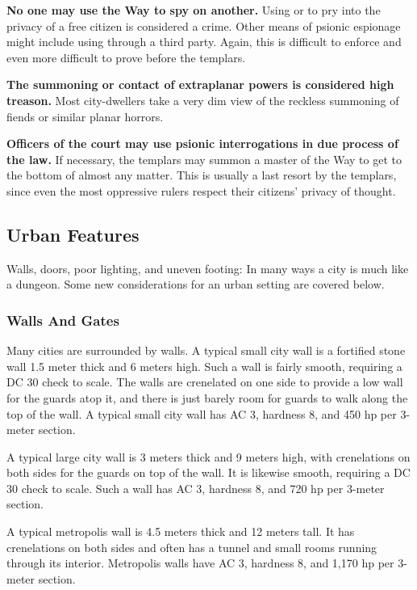 \begin{itemize*}
\item \textbf{No one may use the Way to spy on another.} Using  or  to pry into the privacy of a free citizen is considered a crime. Other means of psionic espionage might include using  through a third party. Again, this is difficult to enforce and even more difficult to prove before the templars.

\item \textbf{The summoning or contact of extraplanar powers is considered high treason.} Most city-dwellers take a very dim view of the reckless summoning of fiends or similar planar horrors.

\item \textbf{Officers of the court may use psionic interrogations in due process of the law.} If necessary, the templars may summon a master of the Way to get to the bottom of almost any matter. This is usually a last resort by the templars, since even the most oppressive rulers respect their citizens' privacy of thought. 
\end{itemize*}

\subsection{Urban Features}
Walls, doors, poor lighting, and uneven footing: In many ways a city is much like a dungeon. Some new considerations for an urban setting are covered below.

\subsubsection{Walls And Gates}
Many cities are surrounded by walls. A typical small city wall is a fortified stone wall 1.5 meter thick and 6 meters high. Such a wall is fairly smooth, requiring a DC 30  check to scale. The walls are crenelated on one side to provide a low wall for the guards atop it, and there is just barely room for guards to walk along the top of the wall. A typical small city wall has AC 3, hardness 8, and 450 hp per 3-meter section.

A typical large city wall is 3 meters thick and 9 meters high, with crenelations on both sides for the guards on top of the wall. It is likewise smooth, requiring a DC 30  check to scale. Such a wall has AC 3, hardness 8, and 720 hp per 3-meter section.

A typical metropolis wall is 4.5 meters thick and 12 meters tall. It has crenelations on both sides and often has a tunnel and small rooms running through its interior. Metropolis walls have AC 3, hardness 8, and 1,170 hp per 3-meter section.

